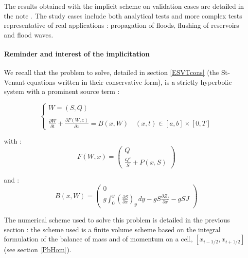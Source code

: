 \vspace{0.5cm}

The results obtained with the implicit scheme on validation cases are detailed in the note \cite{GOUTAL02}. The study cases include both analytical tests and more complex tests representative of real applications : propagation of floods, flushing of reservoirs and flood waves.

\paragraph{Reminder and interest of the implicitation\\}

\hspace*{1cm}

We recall that the problem to solve, detailed in section \ref{ESVTcons} (the St-Venant equations written in their conservative form), is a strictly hyperbolic system with a prominent source term :

\begin{equation}
  \label{PbP}
   \left \lbrace
  \begin{array}{l}
   W = (S,Q) \\
  \\
   \frac{\partial W}{\partial t} + \frac{\partial F(W,x)}{\partial x} = B(x,W) \quad (x,t) \in [a,b] \times [0,T] 
\end{array}
 \right.
\end{equation}

with :
\begin{equation}
 F(W,x) = \left ( \begin{array}{c}
       Q \\
       \frac{Q^2}{S} + P(x,S)
    \end{array} \right )
\end{equation}

and :
\begin{equation}
 B(x,W) = \left ( \begin{array}{c}
       0 \\
       g \int_{0}^y \left ( \frac{\partial S}{\partial x} \right )_y \, dy - g S \frac{\partial Z_f}{\partial x} - g S J
    \end{array} \right )
\end{equation}

\vspace{0.5cm}

The numerical scheme used to solve this problem is detailed in the previous section : the scheme used is a finite volume scheme based on the integral formulation of the balance of mass and of momentum on a cell, $[x_{i-1/2}, x_{i+1/2}]$ (see section \ref{PbHom}).

